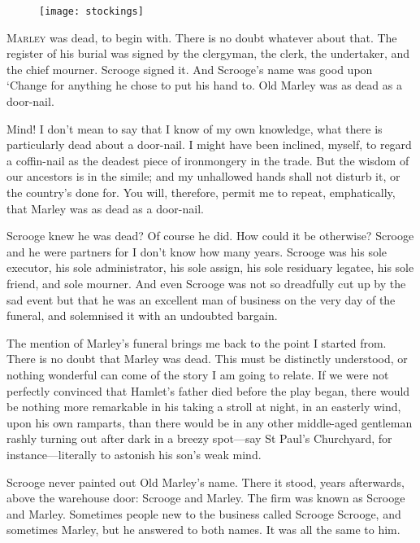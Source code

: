 \begin{figure}[h]
\centering
\texttt{[image: stockings]}
\caption[Headpiece to Stave I]{}
\end{figure}
\lettrine[lines=4]{M}{arley} was dead, to begin with. There is no doubt what\-ev\-er about that. The register of his burial was signed by the clergyman, the clerk, the undertaker, and the chief mourner. Scrooge signed it. And Scrooge's name was good upon `Change for anything he chose to put his hand to. Old Marley was as dead as a door-nail.

Mind! I don't mean to say that I know of my own knowledge, what there is particularly dead about a door-nail. I might have been inclined, myself, to regard a coffin-nail as the deadest piece of ironmongery in the trade. But the wisdom of our ancestors is in the simile; and my unhallowed hands shall not disturb it, or the country's done for. You will, therefore, permit me to repeat, emphatically, that Marley was as dead as a door-nail.

Scrooge knew he was dead? Of course he did. How could it be otherwise? Scrooge and he were partners for I don't know how many years. Scrooge was his sole executor, his sole administrator, his sole assign, his sole residuary legatee, his sole friend, and sole mourner. And even Scrooge was not so dreadfully cut up by the sad event but that he was an excellent man of business on the very day of the funeral, and solemnised it with an undoubted bargain.

The mention of Marley's funeral brings me back to the point I started from. There is no doubt that Marley was dead. This must be distinctly understood, or nothing wonderful can come of the story I am going to relate. If we were not perfectly convinced that Hamlet's father died before the play began, there would be nothing more remarkable in his taking a stroll at night, in an easterly wind, upon his own ramparts, than there would be in any other middle-aged gentleman rashly turning out after dark in a breezy spot—say St Paul's Churchyard, for instance—literally to astonish his son's weak mind.

Scrooge never painted out Old Marley's name. There it stood, years afterwards, above the warehouse door: Scrooge and Marley. The firm was known as Scrooge and Marley. Sometimes people new to the business called Scrooge Scrooge, and sometimes Marley, but he answered to both names. It was all the same to him.

